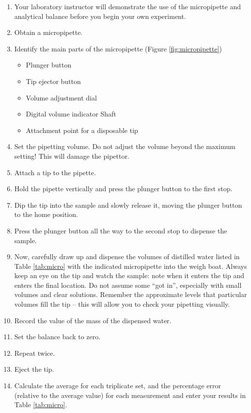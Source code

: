 \documentclass[]{book}
\providecommand{\tightlist}{%
  \setlength{\itemsep}{0pt}\setlength{\parskip}{0pt}}
\theoremstyle{definition}
\theoremstyle{definition}
\theoremstyle{definition}
\theoremstyle{remark}
\begin{document}
\begin{enumerate}
\def\labelenumi{\arabic{enumi}.}
\tightlist
\item
  Your laboratory instructor will demonstrate the use of the
  micropipette and analytical balance before you begin your own
  experiment.
\item
  Obtain a micropipette.
\item
  Identify the main parts of the micropipette (Figure
  \ref{fig:micropipette})

  \begin{itemize}
  \tightlist
  \item
    Plunger button
  \item
    Tip ejector button
  \item
    Volume adjustment dial
  \item
    Digital volume indicator Shaft
  \item
    Attachment point for a disposable tip
  \end{itemize}
\item
  Set the pipetting volume. Do not adjust the volume beyond the maximum
  setting! This will damage the pipettor.
\item
  Attach a tip to the pipette.
\item
  Hold the pipette vertically and press the plunger button to the first
  stop.
\item
  Dip the tip into the sample and slowly release it, moving the plunger
  button to the home position.
\item
  Press the plunger button all the way to the second stop to dispense
  the sample.
\item
  Now, carefully draw up and dispense the volumes of distilled water
  listed in Table \ref{tab:micro} with the indicated micropipette into
  the weigh boat. Always keep an eye on the tip and watch the sample:
  note when it enters the tip and enters the final location. Do not
  assume some ``got in'', especially with small volumes and clear
  solutions. Remember the approximate levels that particular volumes
  fill the tip -- this will allow you to check your pipetting visually.
\item
  Record the value of the mass of the dispensed water.
\item
  Set the balance back to zero.
\item
  Repeat twice.
\item
  Eject the tip.
\item
  Calculate the average for each triplicate set, and the percentage
  error (relative to the average value) for each measurement and enter
  your results in Table \ref{tab:micro}.
\end{enumerate}
\end{document}
